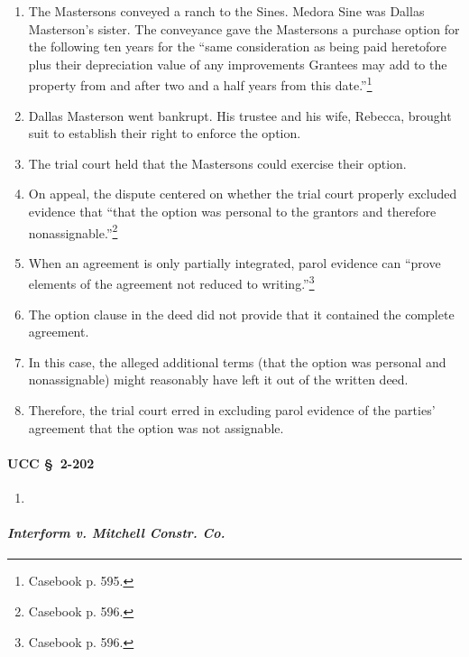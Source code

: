 \begin{enumerate}
    \item The Mastersons conveyed a ranch to the Sines. Medora Sine was Dallas 
    Masterson's sister. The conveyance gave the Mastersons a purchase option 
    for the following ten years for the ``same consideration as being paid 
    heretofore plus their depreciation value of any improvements Grantees may 
    add to the property from and after two and a half years from this 
    date.''\footnote{Casebook p. 595.}
    \item Dallas Masterson went bankrupt. His trustee and his wife, Rebecca, 
    brought suit to establish their right to enforce the option.
    \item The trial court held that the Mastersons could exercise their 
    option.
    \item On appeal, the dispute centered on whether the trial court properly 
    excluded evidence that ``that the option was personal to the grantors and 
    therefore nonassignable.''\footnote{Casebook p. 596.}
    \item When an agreement is only partially integrated, parol evidence can 
    ``prove elements of the agreement not reduced to 
    writing.''\footnote{Casebook p. 596.}
    \item The option clause in the deed did not provide that it contained the 
    complete agreement.
    \item In this case, the alleged additional terms (that the option was 
    personal and nonassignable) might reasonably have left it out of the 
    written deed.
    \item Therefore, the trial court erred in excluding parol evidence of the 
    parties' agreement that the option was not assignable.
\end{enumerate}

\paragraph{UCC \S\ 2-202}

\begin{enumerate}
    \item %
\end{enumerate}

\paragraph{\emph{Interform v. Mitchell Constr. Co.}}

